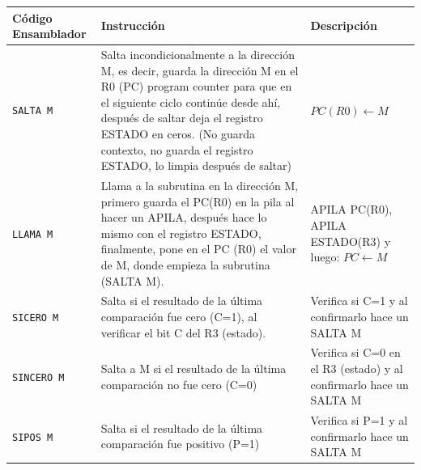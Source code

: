 \documentclass{article}
\begin{document}
\begin{longtable}{|p{}|p{}|p{}|}
  \hline
  \textbf{Código Ensamblador} & \textbf{Instrucción}                                                                                                                                                                                                                                                                            & \textbf{Descripción}                                                                  \\
  \hline
  \texttt{SALTA M}            & Salta incondicionalmente a la dirección M, es decir, guarda la dirección M en el R0 (PC) program counter para que en el siguiente ciclo continúe desde ahí, después de saltar deja el registro ESTADO en ceros. (No guarda contexto, no guarda el registro ESTADO, lo limpia después de saltar) & $PC(R0) \leftarrow M$                                                                 \\
  \hline
  \texttt{LLAMA M}            & Llama a la subrutina en la dirección M, primero guarda el PC(R0) en la pila al hacer un APILA, después hace lo mismo con el registro ESTADO, finalmente, pone en el PC (R0) el valor de M, donde empieza la subrutina (SALTA M).                                                                & APILA PC(R0), APILA ESTADO(R3) y luego: $PC \leftarrow M$                             \\
  \hline
  \texttt{SICERO M}           & Salta si el resultado de la última comparación fue cero (C=1), al verificar el bit C del R3 (estado).                                                                                                                                                                                           & Verifica si C=1 y al confirmarlo hace un SALTA M                                      \\
  \hline
  \texttt{SINCERO M}          & Salta a M si el resultado de la última comparación no fue cero (C=0)                                                                                                                                                                                                                            & Verifica si C=0 en el R3 (estado) y al confirmarlo hace un SALTA M                    \\
  \hline
  \texttt{SIPOS M}            & Salta si el resultado de la última comparación fue positivo (P=1)                                                                                                                                                                                                                               & Verifica si P=1 y al confirmarlo hace un SALTA M                                      \\

\end{longtable}
\end{document}

